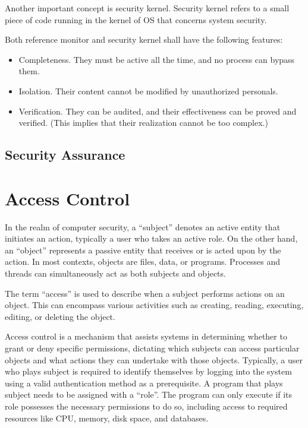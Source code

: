 Another important concept is security kernel. Security kernel refers to a small piece of code running in the kernel of OS that concerns system security.

Both reference monitor and security kernel shall have the following features:
\begin{itemize}
  \item Completeness. They must be active all the time, and no process can bypass them.
  \item Isolation. Their content cannot be modified by unauthorized personals.
  \item Verification. They can be audited, and their effectiveness can be proved and verified. (This implies that their realization cannot be too complex.)
\end{itemize}

\subsection{Security Assurance}










\section{Access Control}

In the realm of computer security, a ``subject'' denotes an active entity that initiates an action, typically a user who takes an active role. On the other hand, an ``object'' represents a passive entity that receives or is acted upon by the action. In most contexts, objects are files, data, or programs. Processes and threads can simultaneously act as both subjects and objects.

The term ``access'' is used to describe when a subject performs actions on an object. This can encompass various activities such as creating, reading, executing, editing, or deleting the object.

Access control is a mechanism that assists systems in determining whether to grant or deny specific permissions, dictating which subjects can access particular objects and what actions they can undertake with those objects. Typically, a user who plays subject is required to identify themselves by logging into the system using a valid authentication method as a prerequisite. A program that plays subject needs to be assigned with a ``role''. The program can only execute if its role possesses the necessary permissions to do so, including access to required resources like CPU, memory, disk space, and databases.

